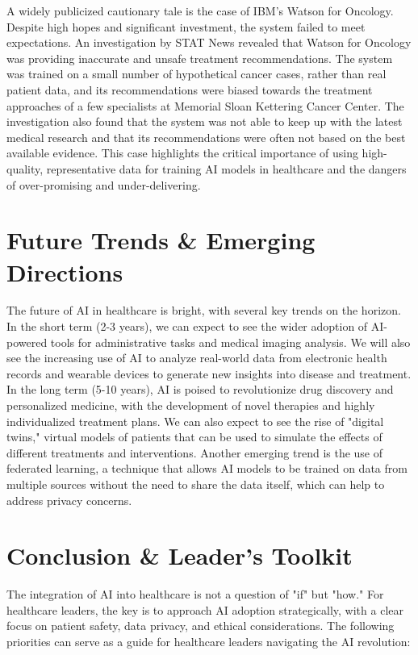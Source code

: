 A widely publicized cautionary tale is the case of IBM's Watson for Oncology. Despite high hopes and significant investment, the system failed to meet expectations. An investigation by STAT News revealed that Watson for Oncology was providing inaccurate and unsafe treatment recommendations. The system was trained on a small number of hypothetical cancer cases, rather than real patient data, and its recommendations were biased towards the treatment approaches of a few specialists at Memorial Sloan Kettering Cancer Center. The investigation also found that the system was not able to keep up with the latest medical research and that its recommendations were often not based on the best available evidence. This case highlights the critical importance of using high-quality, representative data for training AI models in healthcare and the dangers of over-promising and under-delivering.

\section{Future Trends \& Emerging Directions}

The future of AI in healthcare is bright, with several key trends on the horizon. In the short term (2-3 years), we can expect to see the wider adoption of AI-powered tools for administrative tasks and medical imaging analysis. We will also see the increasing use of AI to analyze real-world data from electronic health records and wearable devices to generate new insights into disease and treatment. In the long term (5-10 years), AI is poised to revolutionize drug discovery and personalized medicine, with the development of novel therapies and highly individualized treatment plans. We can also expect to see the rise of "digital twins," virtual models of patients that can be used to simulate the effects of different treatments and interventions. Another emerging trend is the use of federated learning, a technique that allows AI models to be trained on data from multiple sources without the need to share the data itself, which can help to address privacy concerns.

\section{Conclusion \& Leader’s Toolkit}

The integration of AI into healthcare is not a question of "if" but "how." For healthcare leaders, the key is to approach AI adoption strategically, with a clear focus on patient safety, data privacy, and ethical considerations. The following priorities can serve as a guide for healthcare leaders navigating the AI revolution:

